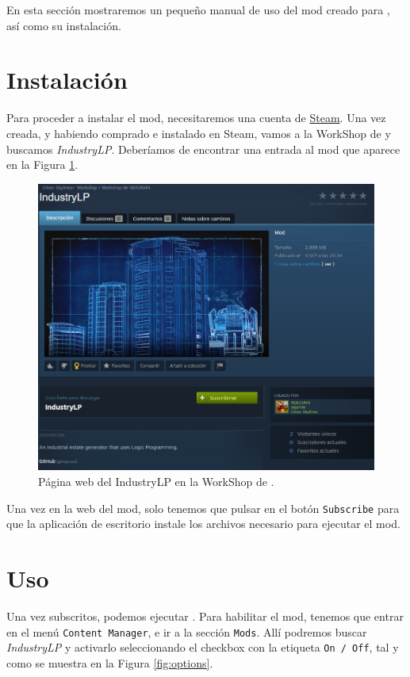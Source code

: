 En esta sección mostraremos un pequeño manual de uso del mod creado para \cities, así como su instalación.

\section{Instalación}

Para proceder a instalar el mod, necesitaremos una cuenta de \href{https://store.steampowered.com/}{Steam}. Una vez creada, y habiendo comprado e instalado \cities en Steam, vamos a la WorkShop de \cities y buscamos \textit{IndustryLP}. Deberíamos de encontrar una entrada al mod que aparece en la Figura \ref{fig:mod}. \\

\begin{figure}[h]
	\centering
	\includegraphics[width=\textwidth]{images/workshop}
	\caption{Página web del IndustryLP en la WorkShop de \cities.}
	\label{fig:mod}
\end{figure}

Una vez en la web del mod, solo tenemos que pulsar en el botón \texttt{Subscribe} para que la aplicación de escritorio instale los archivos necesario para ejecutar el mod.

\section{Uso}

Una vez subscritos, podemos ejecutar \cities. Para habilitar el mod, tenemos que entrar en el menú \texttt{Content Manager}, e ir a la sección \texttt{Mods}. Allí podremos buscar \textit{IndustryLP} y activarlo seleccionando el checkbox con la etiqueta \texttt{On / Off}, tal y como se muestra en la Figura \ref{fig:options}. \\

